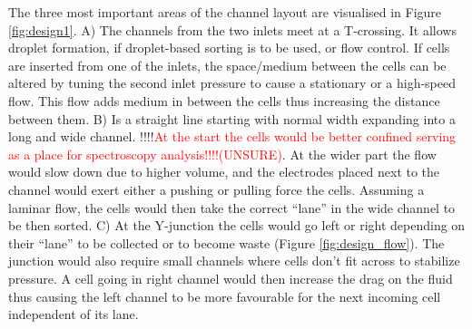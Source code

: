 \documentclass[final]{jyflluk}
\begin{document}
The three most important areas of the channel layout are visualised in Figure \ref{fig:design1}. A) The channels from the two inlets meet at a T-crossing. It allows droplet formation, if droplet-based sorting is to be used, or flow control. If cells are inserted from one of the inlets, the space/medium between the cells can be altered by tuning the second inlet pressure to cause a stationary or a high-speed flow. This flow adds medium in between the cells thus increasing the distance between them. B) Is a straight line starting with normal width expanding into a long and wide channel. !!!!\textcolor{red}{At the start the cells would be better confined serving as a place for spectroscopy analysis!!!!(UNSURE)}. At the wider part the flow would slow down due to higher volume, and the electrodes placed next to the channel would exert either a pushing or pulling force the cells. Assuming a laminar flow, the cells would then take the correct “lane” in the wide channel to be then sorted. C) At the Y-junction the cells would go left or right depending on their “lane” to be collected or to become waste (Figure \ref{fig:design_flow}). The junction would also require small channels where cells don’t fit across to stabilize pressure. A cell going in right channel would then increase the drag on the fluid thus causing the left channel to be more favourable for the next incoming cell independent of its lane.
\end{document}
